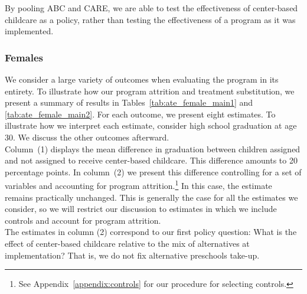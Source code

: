\noindent By pooling ABC and CARE, we are able to test the effectiveness of center-based childcare as a policy, rather than testing the effectiveness of a program as it was implemented.\\

\subsubsection{Females} \label{section:centerfemales}

\noindent We consider a large variety of outcomes when evaluating the program in its entirety. To illustrate how our program attrition and treatment substitution, we present a summary of results in Tables~\ref{tab:ate_female_main1} and \ref{tab:ate_female_main2}. For each outcome, we present eight estimates. To illustrate how we interpret each estimate, consider high school graduation at age 30. We discuss the other outcomes afterward.\\

\noindent Column~(1) displays the mean difference in graduation between children assigned and not assigned to receive center-based childcare. This difference amounts to 20 percentage points. In column~(2) we present this difference controlling for a set of variables and accounting for program attrition.\footnote{See Appendix~\ref{appendix:controls} for our procedure for selecting controls.} In this case, the estimate remains practically unchanged. This is generally the case for all the estimates we consider, so we will restrict our discussion to estimates in which we include controls and account for program attrition.\\

\noindent The estimates in column (2) correspond to our first policy question: What is the effect of center-based childcare relative to the mix of alternatives at implementation? That is, we do not fix alternative preschools take-up.\\

